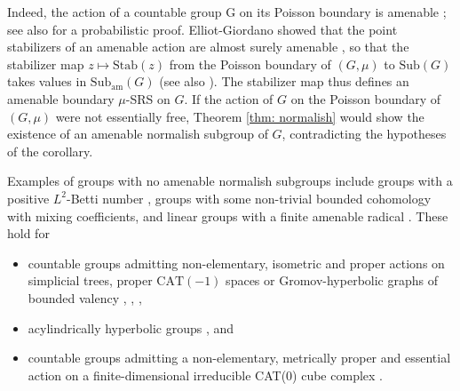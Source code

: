 \documentclass[reqno,a4paper,11pt]{amsart}
\numberwithin{equation}{section}
\newcommand{\1}{\mathbf{1}}
\theoremstyle{definition}
\begin{document}
Indeed, the action of a countable group G on its Poisson boundary is amenable \cite[Corollary 5.3]{Zimmer1978}; see also \cite[Theorem 5.2]{Kaimanovich2005} for a probabilistic proof. Elliot-Giordano showed that the point stabilizers of an amenable action are almost surely amenable \cite[Proposition 1.2]{ElliotGiordano1993}, so that the stabilizer map $z \mapsto \mathrm{Stab}(z)$ from the Poisson boundary of $(G, \mu)$ to $\mathrm{Sub}(G)$ takes values in $\mathrm{Sub}_\mathrm{am}(G)$ (see also \cite[Corollary 5.3.33]{AR2000}). The stabilizer map thus defines an amenable boundary $\mu$-SRS on $G$. If the action of $G$ on the Poisson boundary of $(G, \mu)$ were not essentially free, Theorem \ref{thm: normalish} would show the existence of an amenable normalish subgroup of $G$, contradicting the hypotheses of the corollary.


Examples of groups with no amenable normalish subgroups include groups with a positive $L^2$-Betti number \cite[Corollary 1.5]{BaderFurmanSauer2014}, groups with some non-trivial bounded cohomology with mixing coefficients, and linear groups with a finite amenable radical \cite[Propositions 6.3 \& 6.4]{BreuillardKalantarKennedyOzawa2017}. These hold for
\begin{itemize}
	\item  countable groups admitting non-elementary, isometric and proper actions on simplicial trees, proper $\mathrm{CAT}(-1)$ spaces or Gromov-hyperbolic graphs of bounded valency \cite[Theorem 1.3]{MonodShalom2006}, \cite[Corollaries 7.6 \& 7.8, Theorem 7.13]{MonodShalom2004}, \cite[Theorem 3]{MineyevMonodShalom2004},
	\item  acylindrically hyperbolic groups \cite[Corollary 1.5]{Osin2016}, and
	\item countable groups admitting a non-elementary, metrically proper and essential action on a finite-dimensional irreducible CAT(0) cube complex \cite[Corollary 1.8]{ChatterjiFernosIozzi2016}.
\end{itemize}
\end{document}
